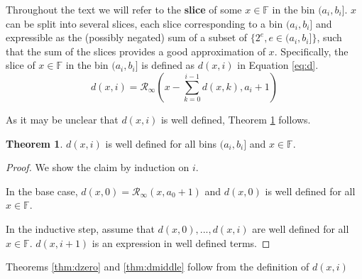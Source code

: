 \documentclass[12pt]{article}
\providecommand{\F}{\ensuremath{\mathbb{F}}}
\providecommand{\roundtonearestinfty}{\ensuremath{\mathcal{R}_\text{$\infty$}}}
\theoremstyle{definition}
\newtheorem{thm}{Theorem}[section]
\numberwithin{equation}{section}
\begin{document}
    Throughout the text we will refer to the \textbf{slice} of some $x \in \F$ in the bin $(a_i, b_i]$. $x$ can be split into several slices, each slice corresponding to a bin $(a_i, b_i]$ and expressible as the (possibly negated) sum of a subset of $\{2^e, e \in (a_i, b_i]\}$, such that the sum of the slices provides a good approximation of $x$. Specifically, the slice of $x \in \F$ in the bin $(a_i, b_i]$ is defined as $d(x, i)$ in Equation \ref{eq:d}.
    \begin{equation}
      d(x, i) = \roundtonearestinfty(x - \sum\limits_{k=0}^{i - 1}d(x,k), a_i + 1)
      \label{eq:d}
    \end{equation}

    As it may be unclear that $d(x, i)$ is well defined, Theorem \ref{thm:ddefined} follows.
    \begin{thm}
      $d(x, i)$ is well defined for all bins $(a_i, b_i]$ and $x \in \F$.
      \label{thm:ddefined}
    \end{thm}
    \begin{proof}
      We show the claim by induction on $i$.

      In the base case, $d(x, 0) = \roundtonearestinfty(x, a_0 + 1)$ and $d(x, 0)$ is well defined for all $x \in \F$.

      In the inductive step, assume that $d(x, 0), ..., d(x, i)$ are well defined for all $x \in \F$. $d(x, i + 1)$ is an expression in well defined terms.
    \end{proof}

    Theorems \ref{thm:dzero} and \ref{thm:dmiddle} follow from the definition of $d(x, i)$
\end{document}
